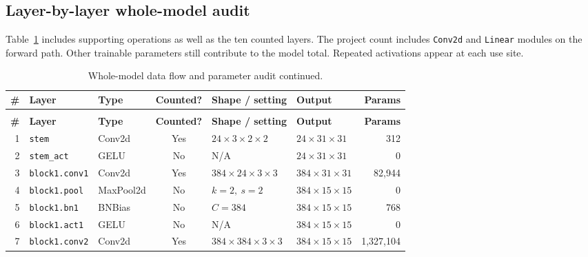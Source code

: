 \documentclass[11pt]{article}
\begin{document}
\subsection{Layer-by-layer whole-model audit}

Table~\ref{tab:layerdata} includes supporting operations as well as the ten counted layers. The project count includes \texttt{Conv2d} and \texttt{Linear} modules on the forward path. Other trainable parameters still contribute to the model total. Repeated activations appear at each use site.


\begingroup
\scriptsize
\renewcommand{\arraystretch}{1.08}
\setlength{\tabcolsep}{2pt}
\begin{longtable}{@{}r
>{\raggedright\arraybackslash}p{}
>{\raggedright\arraybackslash}p{}
c
>{\raggedright\arraybackslash}p{}
>{\raggedright\arraybackslash}p{}
r@{}}
\label{tab:layerdata}\\
\toprule
\rowcolor{gray!18}
\textbf{\#} & \textbf{Layer} & \textbf{Type} & \textbf{Counted?} &
\textbf{Shape / setting} & \textbf{Output} & \textbf{Params} \\
\midrule
\endfirsthead
\caption[]{Whole-model data flow and parameter audit continued.}\\
\toprule
\rowcolor{gray!18}
\textbf{\#} & \textbf{Layer} & \textbf{Type} & \textbf{Counted?} &
\textbf{Shape / setting} & \textbf{Output} & \textbf{Params} \\
\midrule
\endhead
\bottomrule
\endfoot
\bottomrule
\endlastfoot
\rowcolor{gray!5}
1 & \texttt{stem} & Conv2d & Yes & $24{\times}3{\times}2{\times}2$ &
$24{\times}31{\times}31$ & 312 \\
2 & \texttt{stem\_act} & GELU & No & N/A &
$24{\times}31{\times}31$ & 0 \\
\rowcolor{gray!5}
3 & \texttt{block1.conv1} & Conv2d & Yes & $384{\times}24{\times}3{\times}3$ &
$384{\times}31{\times}31$ & 82,944 \\
4 & \texttt{block1.pool} & MaxPool2d & No & $k{=}2,\ s{=}2$ &
$384{\times}15{\times}15$ & 0 \\
\rowcolor{gray!5}
5 & \texttt{block1.bn1} & BNBias & No & $C{=}384$ &
$384{\times}15{\times}15$ & 768 \\
6 & \texttt{block1.act1} & GELU & No & N/A &
$384{\times}15{\times}15$ & 0 \\
\rowcolor{gray!5}
7 & \texttt{block1.conv2} & Conv2d & Yes & $384{\times}384{\times}3{\times}3$ &
$384{\times}15{\times}15$ & 1,327,104 \\

\end{longtable}
\end{document}
